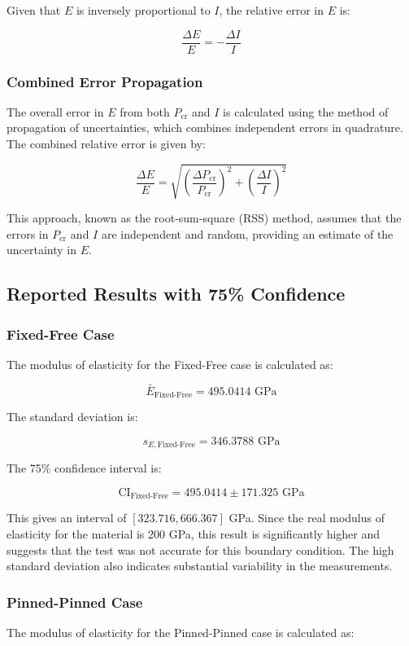 \documentclass[12pt]{article}
\begin{document}
Given that \( E \) is inversely proportional to \( I \), the relative error in \( E \) is:

\[
\frac{\Delta E}{E} = -\frac{\Delta I}{I}
\]

\subsubsection{Combined Error Propagation}
\label{subsubsec:combined_error}

The overall error in \( E \) from both \( P_{\text{cr}} \) and \( I \) is calculated using the method of propagation of uncertainties, which combines independent errors in quadrature. The combined relative error is given by:

\[
\frac{\Delta E}{E} = \sqrt{\left(\frac{\Delta P_{\text{cr}}}{P_{\text{cr}}}\right)^2 + \left(\frac{\Delta I}{I}\right)^2}
\]

This approach, known as the root-sum-square (RSS) method, assumes that the errors in \( P_{\text{cr}} \) and \( I \) are independent and random, providing an estimate of the uncertainty in \( E \).

\subsection{Reported Results with 75\% Confidence}
\label{subsec:reported_results}


\subsubsection{Fixed-Free Case}
The modulus of elasticity for the Fixed-Free case is calculated as:

\[
\bar{E}_{\text{Fixed-Free}} = 495.0414 \text{ GPa}
\]

The standard deviation is:

\[
s_{E, \text{Fixed-Free}} = 346.3788 \text{ GPa}
\]

The 75\% confidence interval is:

\[
\text{CI}_{\text{Fixed-Free}} = 495.0414 \pm 171.325 \text{ GPa}
\]

This gives an interval of \( [323.716, 666.367] \) GPa. Since the real modulus of elasticity for the material is 200 GPa, this result is significantly higher and suggests that the test was not accurate for this boundary condition. The high standard deviation also indicates substantial variability in the measurements.

\subsubsection{Pinned-Pinned Case}
The modulus of elasticity for the Pinned-Pinned case is calculated as:
\end{document}
